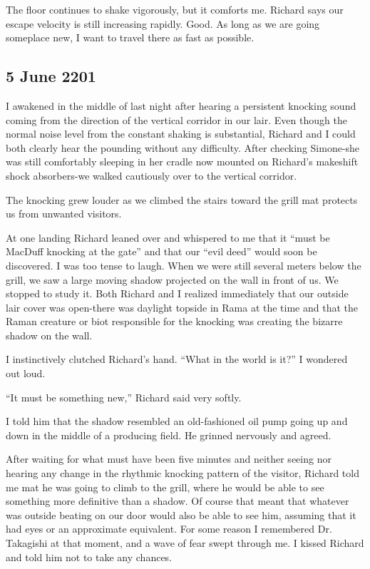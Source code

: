 \documentclass[]{article}
\begin{document}
The floor continues to shake vigorously, but it comforts me.  Richard says our escape velocity is still increasing rapidly.  Good.  As long as we are going someplace new, I want to travel there as fast as possible.

\subsection*{5 June 2201}

I awakened in the middle of last night after hearing a persistent knocking sound coming from the direction of the vertical corridor in our lair.  Even though the normal noise level from the constant shaking is substantial, Richard and I could both clearly hear the pounding without any difficulty.  After checking Simone-she was still comfortably sleeping in her cradle now mounted on Richard’s makeshift shock absorbers-we walked cautiously over to the vertical corridor.

The knocking grew louder as we climbed the stairs toward the grill mat protects us from unwanted visitors.

At one landing Richard leaned over and whispered to me that it “must be MacDuff knocking at the gate” and that our “evil deed” would soon be discovered.  I was too tense to laugh.  When we were still several meters below the grill, we saw a large moving shadow projected on the wall in front of us.  We stopped to study it.  Both Richard and I realized immediately that our outside lair cover was open-there was daylight topside in Rama at the time and that the Raman creature or biot responsible for the knocking was creating the bizarre shadow on the wall.

I instinctively clutched Richard’s hand.  “What in the world is it?” I wondered out loud.

“It must be something new,” Richard said very softly.

I told him that the shadow resembled an old-fashioned oil pump going up and down in the middle of a producing field.  He grinned nervously and agreed.

After waiting for what must have been five minutes and neither seeing nor hearing any change in the rhythmic knocking pattern of the visitor, Richard told me mat he was going to climb to the grill, where he would be able to see something more definitive than a shadow.  Of course that meant that whatever was outside beating on our door would also be able to see him, assuming that it had eyes or an approximate equivalent.  For some reason I remembered Dr.  Takagishi at that moment, and a wave of fear swept through me.  I kissed Richard and told him not to take any chances.
\end{document}
